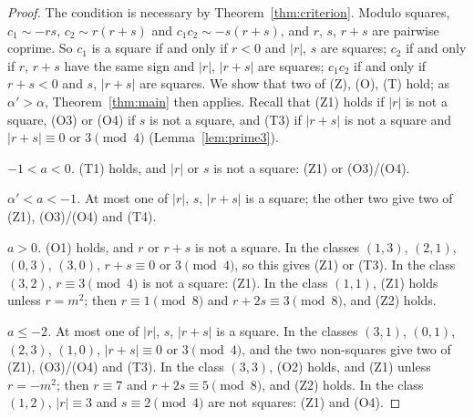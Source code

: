 \begin{proof}
  \leanok
  The condition is necessary by Theorem~\ref{thm:criterion}. Modulo squares, $c_1 \sim -rs$,
  $c_2 \sim r(r+s)$ and $c_1 c_2 \sim -s(r+s)$, and $r$, $s$, $r + s$ are pairwise coprime. So
  $c_1$ is a square if and only if $r < 0$ and $|r|$, $s$ are squares; $c_2$ if and only if $r$,
  $r + s$ have the same sign and $|r|$, $|r + s|$ are squares; $c_1 c_2$ if and only if $r + s < 0$
  and $s$, $|r + s|$ are squares. We show that two of (Z), (O), (T) hold; as $\alpha' > \alpha$,
  Theorem~\ref{thm:main} then applies. Recall that (Z1) holds if $|r|$ is not a square, (O3) or
  (O4) if $s$ is not a square, and (T3) if $|r + s|$ is not a square and $|r + s| \equiv 0$ or
  $3 \pmod 4$ (Lemma~\ref{lem:prime3}).

  \emph{$-1 < a < 0$.} (T1) holds, and $|r|$ or $s$ is not a square: (Z1) or (O3)/(O4).

  \emph{$\alpha' < a < -1$.} At most one of $|r|$, $s$, $|r + s|$ is a square; the other two give
  two of (Z1), (O3)/(O4) and (T4).

  \emph{$a > 0$.} (O1) holds, and $r$ or $r + s$ is not a square. In the classes $(1,3)$,
  $(2,1)$, $(0,3)$, $(3,0)$, $r + s \equiv 0$ or $3 \pmod 4$, so this gives (Z1) or (T3). In the
  class $(3,2)$, $r \equiv 3 \pmod 4$ is not a square: (Z1). In the class $(1,1)$, (Z1) holds
  unless $r = m^2$; then $r \equiv 1 \pmod 8$ and $r + 2s \equiv 3 \pmod 8$, and (Z2) holds.

  \emph{$a \le -2$.} At most one of $|r|$, $s$, $|r + s|$ is a square. In the classes $(3,1)$,
  $(0,1)$, $(2,3)$, $(1,0)$, $|r + s| \equiv 0$ or $3 \pmod 4$, and the two non-squares give two
  of (Z1), (O3)/(O4) and (T3). In the class $(3,3)$, (O2) holds, and (Z1) unless $r = -m^2$; then
  $r \equiv 7$ and $r + 2s \equiv 5 \pmod 8$, and (Z2) holds. In the class $(1,2)$,
  $|r| \equiv 3$ and $s \equiv 2 \pmod 4$ are not squares: (Z1) and (O4).
\end{proof}

